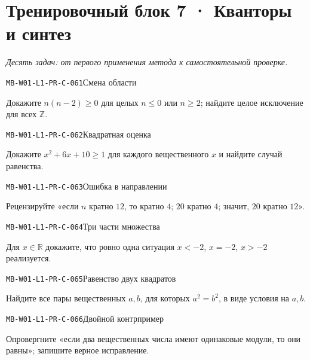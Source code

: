 \documentclass[11pt,a4paper,openany]{book}
\newcommand{\muid}[1]{\texttt{\footnotesize #1}}
\begin{document}
\clearpage\section{Тренировочный блок 7 · Кванторы и синтез}

\textit{Десять задач: от первого применения метода к самостоятельной проверке.}\par

\noindent\hypertarget{MB-W01-L1-PR-C-061}{}\muid{MB-W01-L1-PR-C-061}\quad Смена области\par

Докажите $n(n-2)\ge0$ для целых $n\le0$ или $n\ge2$; найдите целое исключение для всех $\mathbb Z$.\par\medskip

\noindent\hypertarget{MB-W01-L1-PR-C-062}{}\muid{MB-W01-L1-PR-C-062}\quad Квадратная оценка\par

Докажите $x^2+6x+10\ge1$ для каждого вещественного $x$ и найдите случай равенства.\par\medskip

\noindent\hypertarget{MB-W01-L1-PR-C-063}{}\muid{MB-W01-L1-PR-C-063}\quad Ошибка в направлении\par

Рецензируйте «если $n$ кратно $12$, то кратно $4$; $20$ кратно $4$; значит, $20$ кратно $12$».\par\medskip

\noindent\hypertarget{MB-W01-L1-PR-C-064}{}\muid{MB-W01-L1-PR-C-064}\quad Три части множества\par

Для $x\in\mathbb R$ докажите, что ровно одна ситуация $x<-2$, $x=-2$, $x>-2$ реализуется.\par\medskip

\noindent\hypertarget{MB-W01-L1-PR-C-065}{}\muid{MB-W01-L1-PR-C-065}\quad Равенство двух квадратов\par

Найдите все пары вещественных $a,b$, для которых $a^2=b^2$, в виде условия на $a,b$.\par\medskip

\noindent\hypertarget{MB-W01-L1-PR-C-066}{}\muid{MB-W01-L1-PR-C-066}\quad Двойной контрпример\par

Опровергните «если два вещественных числа имеют одинаковые модули, то они равны»; запишите верное исправление.\par\medskip
\end{document}
